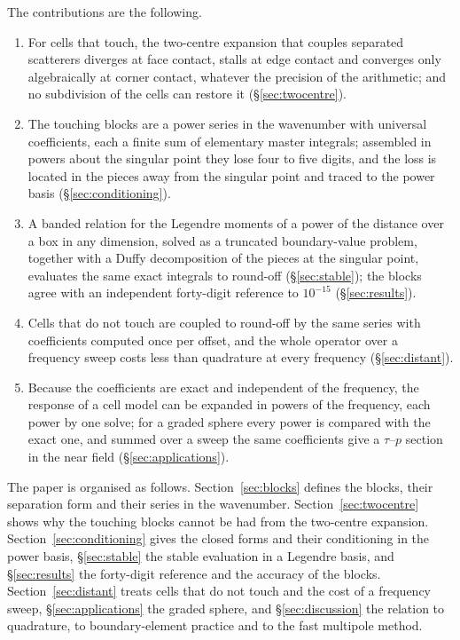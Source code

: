 \documentclass[11pt,a4paper]{article}
\begin{document}
The contributions are the following.
\begin{enumerate}
  \item For cells that touch, the two-centre expansion that couples separated scatterers diverges at face
  contact, stalls at edge contact and converges only algebraically at corner contact, whatever the
  precision of the arithmetic; and no subdivision of the cells can restore it (\S\ref{sec:twocentre}).
  \item The touching blocks are a power series in the wavenumber with universal coefficients, each a finite
  sum of elementary master integrals; assembled in powers about the singular point they lose four to five
  digits, and the loss is located in the pieces away from the singular point and traced to the power basis
  (\S\ref{sec:conditioning}).
  \item A banded relation for the Legendre moments of a power of the distance over a box in any dimension,
  solved as a truncated boundary-value problem, together with a Duffy decomposition of the pieces at the
  singular point, evaluates the same exact integrals to round-off (\S\ref{sec:stable}); the blocks agree
  with an independent forty-digit reference to $10^{-15}$ (\S\ref{sec:results}).
  \item Cells that do not touch are coupled to round-off by the same series with coefficients computed once
  per offset, and the whole operator over a frequency sweep costs less than quadrature at every frequency
  (\S\ref{sec:distant}).
  \item Because the coefficients are exact and independent of the frequency, the response of a cell model
  can be expanded in powers of the frequency, each power by one solve; for a graded sphere every power is
  compared with the exact one, and summed over a sweep the same coefficients give a $\tau$--$p$ section
  in the near field (\S\ref{sec:applications}).
\end{enumerate}

The paper is organised as follows. Section~\ref{sec:blocks} defines the blocks, their separation form
and their series in the wavenumber. Section~\ref{sec:twocentre} shows why the touching blocks cannot be had
from the two-centre expansion. Section~\ref{sec:conditioning} gives the closed forms and their
conditioning in the power basis, \S\ref{sec:stable} the stable evaluation in a Legendre basis, and
\S\ref{sec:results} the forty-digit reference and the accuracy of the blocks. Section~\ref{sec:distant}
treats cells that do not touch and the cost of a frequency sweep, \S\ref{sec:applications} the graded
sphere, and \S\ref{sec:discussion} the relation to quadrature, to boundary-element practice and to the
fast multipole method.
\end{document}

